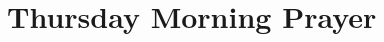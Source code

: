 
\null\medskip{%
\parindent 0pt
\noindent
\ifx\preLilyPondExample \undefined
\else
  \expandafter\preLilyPondExample
\fi
\def\lilypondbook{}%

\ifx\postLilyPondExample \undefined
\else
  \expandafter\postLilyPondExample
\fi
}

\newpage

{%
\parindent 0pt
\noindent
\ifx\preLilyPondExample \undefined
\else
  \expandafter\preLilyPondExample
\fi
\def\lilypondbook{}%

\ifx\postLilyPondExample \undefined
\else
  \expandafter\postLilyPondExample
\fi
}


\null\medskip{%
\parindent 0pt
\noindent
\ifx\preLilyPondExample \undefined
\else
  \expandafter\preLilyPondExample
\fi
\def\lilypondbook{}%

\ifx\postLilyPondExample \undefined
\else
  \expandafter\postLilyPondExample
\fi
}

\newpage


\section{Thursday Morning Prayer}

{%
\parindent 0pt
\noindent
\ifx\preLilyPondExample \undefined
\else
  \expandafter\preLilyPondExample
\fi
\def\lilypondbook{}%

\ifx\postLilyPondExample \undefined
\else
  \expandafter\postLilyPondExample
\fi
}


\null\medskip{%
\parindent 0pt
\noindent
\ifx\preLilyPondExample \undefined
\else
  \expandafter\preLilyPondExample
\fi
\def\lilypondbook{}%

\ifx\postLilyPondExample \undefined
\else
  \expandafter\postLilyPondExample
\fi
}

\newpage

{%
\parindent 0pt
\noindent
\ifx\preLilyPondExample \undefined
\else
  \expandafter\preLilyPondExample
\fi
\def\lilypondbook{}%

\ifx\postLilyPondExample \undefined
\else
  \expandafter\postLilyPondExample
\fi
}

